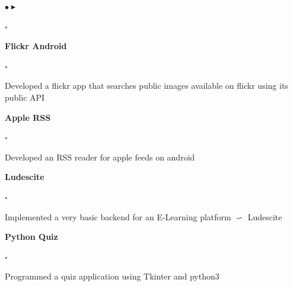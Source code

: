 \documentclass[10pt,a4paper]{extarticle}
\newcommand{\myProjectItem}[2]{
	\item {
		\color{resumeBlueDark}
		\textbf{#1}}\\#2
	}
\begin{document}
\begin{minipage}{0.55\textwidth}
\begin{list}{{\color{resumeBlueLight}$\bullet\blacktriangleright$}}{}
{\begin{list}{\color{resumeBlueLight}$\square$}{\leftmargin 3mm}
		\end{list}
		}		
		\myProjectItem{Flickr Android}{
		\vspace{-5mm}
		\begin{list}{\color{resumeBlueLight}$\square$}{\leftmargin 3mm}
		\item{Developed a flickr app that searches public images available on flickr using its public API}
		\end{list}
		}
		\myProjectItem{Apple RSS}{
		\vspace{-5mm}
		\begin{list}{\color{resumeBlueLight}$\square$}{\leftmargin 3mm}
		\item{Developed an RSS reader for apple feeds on android}
		\end{list}
		}
				

		\myProjectItem{Ludescite}{
		\vspace{-5mm}
		\begin{list}{\color{resumeBlueLight}$\square$}{\leftmargin 3mm}
		\item{Implemented a very basic backend for an E-Learning platform $\backsim$ Ludescite}
		\end{list}
		}
		\myProjectItem{Python Quiz}{
		\vspace{-5mm}
		\begin{list}{\color{resumeBlueLight}$\square$}{\leftmargin 3mm}
		\item{Programmed a quiz application using Tkinter and python3}
		\end{list}
		}
	\end{list}
	

\end{minipage}
\end{document}

